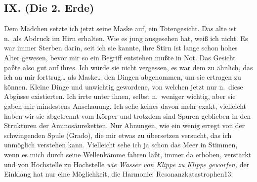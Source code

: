 \documentclass[
]{article}
\author{}
\date{\vspace{-2.5em}}
\begin{document}
\subsection{IX. (Die 2. Erde)}\label{ix.-die-2.-erde}

Dem Mädchen setzte ich jetzt seine Maske auf, ein Totengesicht. Das alte
ist n.~als Abdruck im Hirn erhalten. Wie es jung ausgesehen hat, weiß
ich nicht. Es war immer Sterben darin, seit ich sie kannte, ihre Stirn
ist lange schon hohes Alter gewesen, bevor mir so ein Begriff entstehen
mußte in Not. Das Gesicht paßte also gut auf ihres. Ich würde sie nicht
vergessen, es war dem zu ähnlich, das ich an mir forttrug\ldots{} als
Maske\ldots{} den Dingen abgenommen, um sie ertragen zu können. Kleine
Dinge und unwichtig gewordene, von welchen jetzt nur n.~diese Abgüsse
existierten. Ich irrte unter ihnen, selbst n.~weniger wichtig, aber sie
gaben mir mindestens Anschauung. Ich sehe keines davon mehr exakt,
vielleicht haben wir sie abgetrennt vom Körper und trotzdem sind Spuren
geblieben in den Strukturen der Aminosäureketten. Nur Ahnungen, wie ein
wenig erregt von der schwingenden Spule (Grado), die mir etwas zu
übersetzen versucht, das ich unmöglich verstehen kann. Vielleicht sehe
ich ja schon das Meer in Stimmen, wenn es mich durch seine Wellenkämme
fahren läßt, immer da erhoben, verstärkt und von Hochstelle zu
Hochstelle \emph{wie Wasser von Klippe zu Klippe geworfen,} der Einklang
hat nur eine Möglichkeit, die Harmonie: Resonanzkatastrophen13.
\end{document}
